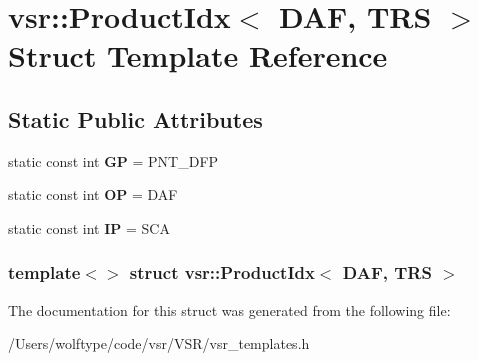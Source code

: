 \hypertarget{structvsr_1_1_product_idx_3_01_d_a_f_00_01_t_r_s_01_4}{\section{vsr\-:\-:Product\-Idx$<$ D\-A\-F, T\-R\-S $>$ Struct Template Reference}
\label{structvsr_1_1_product_idx_3_01_d_a_f_00_01_t_r_s_01_4}
}
\subsection*{Static Public Attributes}
\begin{DoxyCompactItemize}
\item 
\hypertarget{structvsr_1_1_product_idx_3_01_d_a_f_00_01_t_r_s_01_4_a14814e447da31508dc34ad303f0cea35}{static const int {\bfseries G\-P} = P\-N\-T\-\_\-\-D\-F\-P}\label{structvsr_1_1_product_idx_3_01_d_a_f_00_01_t_r_s_01_4_a14814e447da31508dc34ad303f0cea35}

\item 
\hypertarget{structvsr_1_1_product_idx_3_01_d_a_f_00_01_t_r_s_01_4_ad2f4f33fb49e1c3e968966e511a156d6}{static const int {\bfseries O\-P} = D\-A\-F}\label{structvsr_1_1_product_idx_3_01_d_a_f_00_01_t_r_s_01_4_ad2f4f33fb49e1c3e968966e511a156d6}

\item 
\hypertarget{structvsr_1_1_product_idx_3_01_d_a_f_00_01_t_r_s_01_4_a648cc34cf4fa6cc27d1602c27780ba31}{static const int {\bfseries I\-P} = S\-C\-A}\label{structvsr_1_1_product_idx_3_01_d_a_f_00_01_t_r_s_01_4_a648cc34cf4fa6cc27d1602c27780ba31}

\end{DoxyCompactItemize}
\subsubsection*{template$<$$>$ struct vsr\-::\-Product\-Idx$<$ D\-A\-F, T\-R\-S $>$}



The documentation for this struct was generated from the following file\-:\begin{DoxyCompactItemize}
\item 
/\-Users/wolftype/code/vsr/\-V\-S\-R/vsr\-\_\-templates.\-h\end{DoxyCompactItemize}

